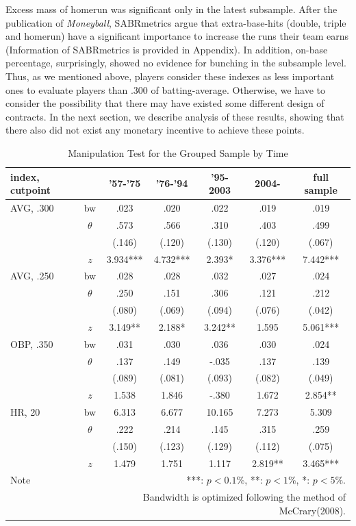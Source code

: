 \documentclass[dvipdfmx, 12pt]{article}
\begin{document}
Excess mass of homerun was significant only in the latest subsample. After the publication of \textit{Moneyball}, SABRmetrics argue that extra-base-hits (double, triple and homerun) have a significant importance to increase the runs their team earns (Information of SABRmetrics is provided in Appendix). In addition, on-base percentage, surprisingly, showed no evidence for bunching in the subsample level. Thus, as we mentioned above, players consider these indexes as less important ones to evaluate players than .300 of batting-average. Otherwise, we have to consider the possibility that there may have existed some different design of contracts. In the next section, we describe analysis of these results, showing that there also did not exist any monetary incentive to achieve these points.

\begin{table}[H]
  \centering
  \caption{Manipulation Test for the Grouped Sample by Time}
  \label{Mani-Era}
  \footnotesize
  \begin{tabular}{lcccccc} \hline
    index, cutpoint &  & '57-'75 &'76-'94 & '95-2003 & 2004- &full sample \\ \hline \hline
    AVG, .300 & bw & .023 & .020 & .022 & .019 & .019 \\
    & $\theta$ & .573 & .566 & .310 & .403 & .499 \\
    & & (.146) & (.120) & (.130) & (.120) & (.067) \\
    & $z$ & 3.934*** & 4.732*** & 2.393* & 3.376*** & 7.442*** \\ \hline
    AVG, .250 & bw & .028 & .028 & .032 & .027 & .024 \\
    & $\theta$ & .250 & .151 & .306 & .121 & .212 \\
    & & (.080) & (.069) & (.094)& (.076) & (.042) \\
    & $z$ & 3.149** & 2.188* & 3.242** & 1.595 & 5.061*** \\ \hline
    OBP, .350 & bw & .031 & .030 & .036 & .030 & .024 \\
    & $\theta$ & .137 & .149 & -.035 & .137 & .139 \\
    & & (.089) & (.081) & (.093) & (.082) & (.049) \\
    & $z$ & 1.538 & 1.846 & -.380 & 1.672 & 2.854** \\ \hline
    HR, 20 & bw & 6.313 & 6.677 & 10.165 & 7.273 & 5.309 \\
    & $\theta$ & .222 & .214 & .145 & .315 & .259 \\
    & & (.150) & (.123) & (.129) & (.112) & (.075) \\
    & $z$ & 1.479 & 1.751 & 1.117 & 2.819** & 3.465*** \\ \hline
    Note & \multicolumn{6}{r}{
    ***: $p<0.1\%$, **: $p<1\%$, *: $p<5\%$.
    }\\
    & \multicolumn{6}{r}{
    Bandwidth is optimized following the method of McCrary(2008).
    }
  \end{tabular}
\end{table}
\end{document}

